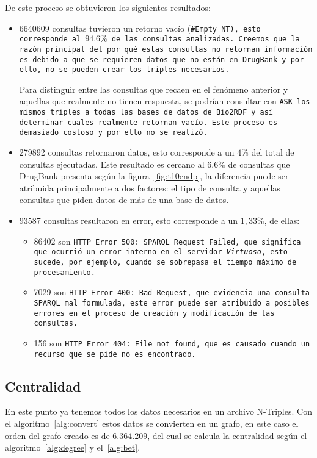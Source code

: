 De este proceso se obtuvieron los siguientes resultados:
\begin{itemize}
  \item
    6640609 consultas tuvieron un retorno vacío (\tt{\#Empty NT}), esto
    corresponde al $94.6\%$ de las consultas analizadas.
    Creemos que la razón principal del por qué estas consultas no retornan
    información es debido a que se requieren datos que no están en DrugBank y
    por ello, no se pueden crear los triples necesarios.

    Para distinguir entre las consultas que recaen en el fenómeno anterior y
    aquellas que realmente no tienen respuesta, se podrían consultar con
    \tt{ASK} los mismos triples a todas las bases de datos de Bio2RDF y así
    determinar cuales realmente retornan vacío.
    Este proceso es demasiado costoso y por ello no se realizó.
  \item
    279892 consultas retornaron datos, esto corresponde a un $4\%$ del total de
    consultas ejecutadas. Este resultado es cercano al $6.6\%$ de consultas que
    DrugBank presenta según la figura~\ref{fig:t10endp}, la diferencia puede ser
    atribuida principalmente a dos factores: el tipo de consulta y aquellas
    consultas que piden datos de más de una base de datos.
  \item
    93587 consultas resultaron en error, esto corresponde a un $1,33\%$, de
    ellas:
    \begin{itemize}
      \item
        86402 son \tt{HTTP Error 500: SPARQL Request Failed}, que significa que
        ocurrió un error interno en el servidor \emph{Virtuoso}, esto sucede,
        por ejemplo, cuando se sobrepasa el tiempo máximo de procesamiento.
      \item 
        7029 son \tt{HTTP Error 400: Bad Request}, que evidencia una consulta
        SPARQL mal formulada, este error puede ser atribuido a posibles
        errores en el proceso de creación y modificación de las consultas.
      \item
        156 son \tt{HTTP Error 404: File not found}, que es causado cuando un
        recurso que se pide no es encontrado.
    \end{itemize}
\end{itemize}

\subsection{Centralidad}\label{sec:res:cent}
En este punto ya tenemos todos los datos necesarios en un archivo N-Triples. Con
el algoritmo~\ref{alg:convert} estos datos se convierten en un grafo, en este
caso el orden del grafo creado es de 6.364.209, del cual se calcula la
centralidad según el algoritmo~\ref{alg:degree} y el~\ref{alg:bet}.

